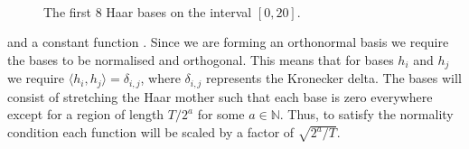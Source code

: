 \documentclass[../main.tex]{subfiles}
\begin{document}
  \begin{figure}[ht!]
   \hrulefill
   \begin{center} 
     \quad
      \\ 
      
          \quad
      \\
       
          \quad
       \\
     
        \quad
    \end{center}     
    \caption{The first 8 Haar bases on the interval $[0,20]$.}
    \label{fig:HaarBasis}
    \hrulefill
    \end{figure}


and a constant function \cite{Haar_1910}.  Since we are forming an orthonormal basis we require the bases to be normalised and orthogonal. This means that for bases $h_i$ and $h_j$ we require $\langle h_i, h_j \rangle = \delta_{i,j}$, where $\delta_{i,j}$ represents the Kronecker delta. The bases will consist of stretching the Haar mother such that each base is zero everywhere except for a region of length $T/2^a$ for some $a \in \mathbb{N}$. Thus, to satisfy the normality condition  each function will be scaled by a factor of $\sqrt{2^{a}/ T}$.
\end{document}
